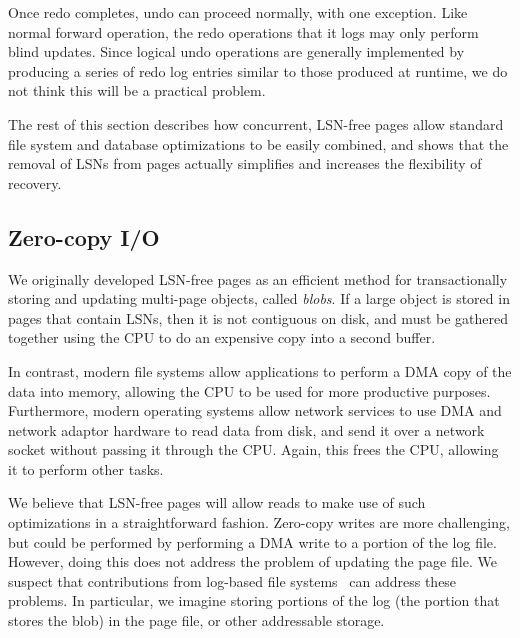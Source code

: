 \documentclass[letterpaper,twocolumn,10pt]{article}
\newcommand{\yad}{Stasis\xspace}
\begin{document}
Once redo completes, undo can proceed normally, with one exception.
Like normal forward operation, the redo operations that it logs may
only perform blind updates.  Since logical undo operations are
generally implemented by producing a series of redo log entries
similar to those produced at runtime, we do not think this will be a
practical problem.

The rest of this section describes how concurrent, LSN-free pages 
allow standard file system and database optimizations to be easily
combined, and shows that the removal of LSNs from pages actually
simplifies and increases the flexibility of recovery.

\subsection{Zero-copy I/O} 

We originally developed LSN-free pages as an efficient method for
transactionally storing and updating multi-page objects, called {\em
blobs}.  If a large object is stored in pages that contain LSNs, then it is not contiguous on disk, and must be gathered together using the CPU to do an expensive copy into a second buffer.

In contrast, modern file systems allow applications to
perform a DMA copy of the data into memory, allowing the CPU to be used for
more productive purposes.  Furthermore, modern operating systems allow
network services to use DMA and network adaptor hardware to read data
from disk, and send it over a network socket without passing it
through the CPU.  Again, this frees the CPU, allowing it to perform
other tasks.

We believe that LSN-free pages will allow reads to make use of such
optimizations in a straightforward fashion.  Zero-copy writes are
 more challenging, but could be performed by performing a DMA write to
a portion of the log file. However, doing this does not address the problem of updating the page
file.  We suspect that contributions from log-based file
systems~\cite{lfs} can address these problems. In
particular, we imagine storing portions of the log (the portion that
stores the blob) in the page file, or other addressable storage.  

\end{document}
